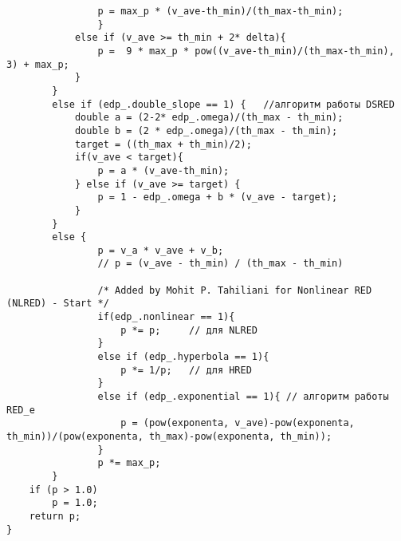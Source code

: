 \begin{verbatim}
        		p = max_p * (v_ave-th_min)/(th_max-th_min);
        		}
        	else if (v_ave >= th_min + 2* delta){
        		p =  9 * max_p * pow((v_ave-th_min)/(th_max-th_min), 3) + max_p;
        	} 
        }
        else if (edp_.double_slope == 1) {   //алгоритм работы DSRED
        	double a = (2-2* edp_.omega)/(th_max - th_min);
        	double b = (2 * edp_.omega)/(th_max - th_min);
        	target = ((th_max + th_min)/2);
        	if(v_ave < target){
        		p = a * (v_ave-th_min);
        	} else if (v_ave >= target) {
        		p = 1 - edp_.omega + b * (v_ave - target);
        	}
        }
        else {
                p = v_a * v_ave + v_b;
                // p = (v_ave - th_min) / (th_max - th_min)
                
                /* Added by Mohit P. Tahiliani for Nonlinear RED (NLRED) - Start */
				if(edp_.nonlinear == 1){
					p *= p;		// для NLRED
				}
				else if (edp_.hyperbola == 1){
					p *= 1/p;	// для HRED
				}
				else if (edp_.exponential == 1){ // алгоритм работы RED_e
					p = (pow(exponenta, v_ave)-pow(exponenta, th_min))/(pow(exponenta, th_max)-pow(exponenta, th_min));
				}
                p *= max_p; 
        }
	if (p > 1.0)
		p = 1.0;
	return p;
}
\end{verbatim}

